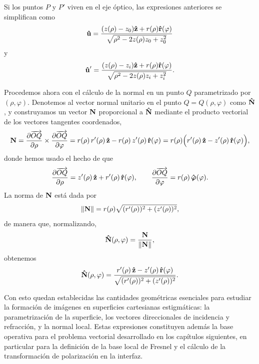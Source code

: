 Si los puntos $P$ y $P'$ viven en el eje óptico, las expresiones anteriores se simplifican como
\begin{equation}
  \bm{\hat{\mathbf{u}}} = \frac{(z(\rho) - z_0)\bm{\hat{\mathbf{z}}} + r(\rho)\bm{\hat{\mathbf{r}}}(\varphi)}{\sqrt{\rho^2 - 2z(\rho)z_0 + z_0^2}}
  \label{eq:u_for_P_in_optical_axis}
\end{equation}
y
\begin{equation}
  \bm{\hat{\mathbf{u}}}' = \frac{(z(\rho) - z_i)\bm{\hat{\mathbf{z}}} + r(\rho)\bm{\hat{\mathbf{r}}}(\varphi)}{\sqrt{\rho^2 - 2z(\rho)z_i + z_i^2}}.
  \label{eq:u_prime_for_P_in_optical_axis}
\end{equation}

Procedemos ahora con el cálculo de la normal en un punto $Q$ parametrizado por $(\rho, \varphi)$. Denotemos al vector normal unitario en el punto $Q=Q(\rho, \varphi)$ como $\bm{\hat{\mathbf{N}}}$, y construyamos un vector $\vb{N}$ proporcional a $\bm{\hat{\mathbf{N}}}$ mediante el producto vectorial de los vectores tangentes coordenados,
\[
  \vb{N} = \frac{\partial \overrightarrow{OQ}}{\partial \rho} \times \frac{\partial \overrightarrow{OQ}}{\partial \varphi}
= r(\rho)\,r'(\rho)\,\bm{\hat{\mathbf{z}}}-r(\rho)\,z'(\rho)\,\bm{\hat{\mathbf{r}}}(\varphi)
= r(\rho)\Bigl(r'(\rho)\,\bm{\hat{\mathbf{z}}}-z'(\rho)\,\bm{\hat{\mathbf{r}}}(\varphi)\Bigr),
\]
donde hemos usado el hecho de que
\[
\frac{\partial \overrightarrow{OQ}}{\partial \rho}
= z'(\rho)\,\bm{\hat{\mathbf{z}}}+r'(\rho)\,\bm{\hat{\mathbf{r}}}(\varphi),
\qquad
\frac{\partial \overrightarrow{OQ}}{\partial \varphi}
= r(\rho)\,\bm{\hat{\mathbf{\varphi}}}(\varphi).
\]
La norma de $\vb{N}$ está dada por
\[
\|\vb{N}\|
= r(\rho)\sqrt{(r'(\rho))^2+(z'(\rho))^2},
\]
de manera que, normalizando,
\[
\bm{\hat{\mathbf{N}}}(\rho,\varphi)=\frac{\vb{N}}{\|\vb{N}\|},
\]
obtenemos
\begin{equation}
\bm{\hat{\mathbf{N}}}(\rho,\varphi) = \frac{r'(\rho)\,\bm{\hat{\mathbf{z}}}-z'(\rho)\,\bm{\hat{\mathbf{r}}}(\varphi)}{\sqrt{(r'(\rho))^2+(z'(\rho))^2}}.
  \label{eq:N_ovoid_rho_and_phi}
\end{equation}




Con esto quedan establecidas las cantidades geométricas esenciales para estudiar
la formación de imágenes en superficies cartesianas estigmáticas: la
parametrización de la superficie, los vectores direccionales de incidencia y
refracción, y la normal local. Estas expresiones constituyen además la base
operativa para el problema vectorial desarrollado en los capítulos siguientes,
en particular para la definición de la base local de Fresnel y el cálculo de la
transformación de polarización en la interfaz.

